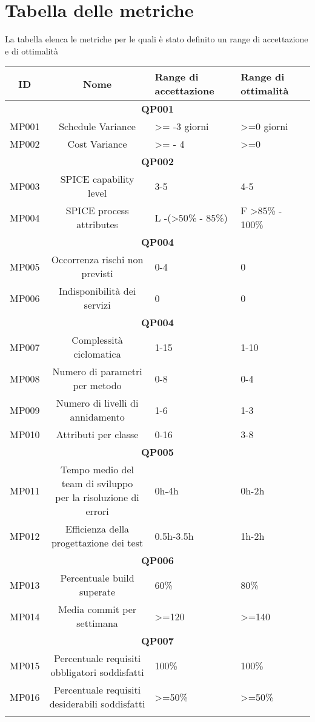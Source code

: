 \section{Tabella delle metriche}
\label{Tab2.2}
La tabella elenca le metriche per le quali è stato definito un range di accettazione e di ottimalità
\begin{tabularx}{\textwidth}{|c|c|X|X|}
	\hline 
	\textbf{ID} & \textbf{Nome} & \textbf{Range di accettazione}  & \textbf{Range di ottimalità}  \\ 
	\hline
	\multicolumn{4}{|c|}{\textbf{QP001}} \\
	\hline
	MP001 & Schedule Variance & >= -3 giorni & >=0 giorni \\ 
	\hline
	MP002 &Cost Variance& >= - 4 &  >=0 \\ 
	\hline
	\multicolumn{4}{|c|}{\textbf{QP002}} \\
	\hline
	MP003 & SPICE capability level & 3-5 & 4-5 \\ 
	\hline 
	MP004 & SPICE process attributes & L -(>50\% - 85\%)  & F >85\% - 100\% \\ 
	\hline
	\multicolumn{4}{|c|}{\textbf{QP004}} \\
	\hline 
	MP005 & Occorrenza rischi non previsti &   0-4 &0 \\
	\hline 
	MP006 & Indisponibilità dei servizi & 0   & 0 \\
	\hline
	\multicolumn{4}{|c|}{\textbf{QP004}} \\
	\hline
	MP007 & Complessità ciclomatica & 1-15 & 1-10 \\ 
	\hline 
	MP008 & Numero di parametri per metodo & 0-8 & 0-4 \\ 
	\hline 
	MP009& Numero di livelli di annidamento & 1-6 & 1-3 \\ 
	\hline 
	MP010 & Attributi per classe & 0-16 & 3-8 \\ 
	\hline 
	\multicolumn{4}{|c|}{\textbf{QP005}} \\
	\hline
	MP011 &\makecell{Tempo medio del team di sviluppo \\ per la risoluzione di errori} & 0h-4h & 0h-2h \\ 
	\hline 
	MP012 & Efficienza della progettazione dei test  & 0.5h-3.5h  & 1h-2h \\ 
	\hline 
	\multicolumn{4}{|c|}{\textbf{QP006}} \\
	\hline
	MP013 & Percentuale build superate& 60\% & 80\%\\
	\hline
	MP014 & Media commit per settimana & >=120 & >=140\\
	\hline
	\multicolumn{4}{|c|}{\textbf{QP007}} \\
	\hline
	MP015& \makecell{Percentuale requisiti \\ obbligatori soddisfatti}& 100\% & 100\%  \\
	\hline
	MP016& \makecell{Percentuale requisiti \\ desiderabili soddisfatti}& >=50\% &>=50\% \\
	\hline
	\caption{Tabella delle metriche dei processi}
\end{tabularx}